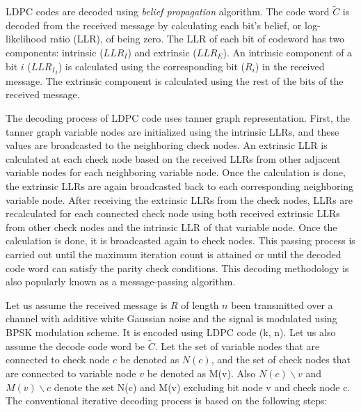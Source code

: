 LDPC codes are decoded using \textit{belief propagation} algorithm. The code word $\tilde{C}$ is decoded from the received message by calculating each bit's belief, or log-likelihood ratio (LLR), of being zero. The LLR of each bit of codeword has two components: intrinsic ($LLR_I$) and extrinsic ($LLR_E$). An intrinsic component of a bit $i$ (${LLR_I}_i$) is calculated using the corresponding bit ($R_i$) in the received message. The extrinsic component is calculated using the rest of the bits of the received message.

The decoding process of LDPC code uses tanner graph representation. First, the tanner graph variable nodes are initialized using the intrinsic LLRs, and these values are broadcasted to the neighboring check nodes. An extrinsic LLR is calculated at each check node based on the received LLRs from other adjacent variable nodes for each neighboring variable node. Once the calculation is done, the extrinsic LLRs are again broadcasted back to each corresponding neighboring variable node. After receiving the extrinsic LLRs from the check nodes, LLRs are recalculated for each connected check node using both received extrinsic LLRs from other check nodes and the intrinsic LLR of that variable node. Once the calculation is done, it is broadcasted again to check nodes. This passing process is carried out until the maximum iteration count is attained or until the decoded code word can satisfy the parity check conditions. This decoding methodology is also popularly known as a message-passing algorithm.

Let us assume the received message is $R$ of length $n$ been transmitted over a channel with additive white Gaussian noise and the signal is modulated using BPSK modulation scheme. It is encoded using LDPC code (k, n). Let us also assume the decode code word be $\tilde{C}$. Let the set of variable nodes that are connected to check node $c$ be denoted as $N(c)$, and the set of check nodes that are connected to variable node $v$ be denoted as M(v). Also $N(c)\backslash v$ and $M(v)\backslash c$ denote the set N(c) and M(v) excluding bit node v and check node c. The conventional iterative decoding process is based on the following steps:


